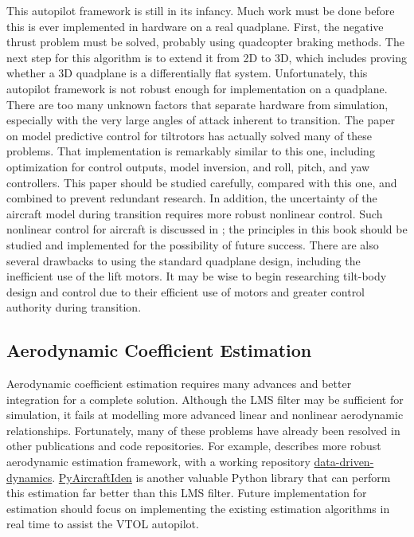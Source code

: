 This autopilot framework is still in its infancy.
Much work must be done before this is ever implemented in hardware on a real quadplane.
First, the negative thrust problem must be solved, probably using quadcopter braking methods.
The next step for this algorithm is to extend it from 2D to 3D, which includes proving whether a 3D quadplane is a differentially flat system.
Unfortunately, this autopilot framework is not robust enough for implementation on a quadplane. 
There are too many unknown factors that separate hardware from simulation, especially with the very large angles of attack inherent to transition.
The paper on model predictive control for tiltrotors \cite{mpc_controller} has actually solved many of these problems.
That implementation is remarkably similar to this one, including optimization for control outputs, model inversion, and roll, pitch, and yaw controllers.
This paper should be studied carefully, compared with this one, and combined to prevent redundant research.
In addition, the uncertainty of the aircraft model during transition requires more robust nonlinear control.
Such nonlinear control for aircraft is discussed in \cite{lavretskyRobustAdaptiveControl2024}; the principles in this book should be studied and implemented for the possibility of future success.
There are also several drawbacks to using the standard quadplane design, including the inefficient use of the lift motors.
It may be wise to begin researching tilt-body design and control \cite{lou_unified_energy_control_tilt_body} due to their efficient use of motors and greater control authority during transition.

\subsection{Aerodynamic Coefficient Estimation}

Aerodynamic coefficient estimation requires many advances and better integration for a complete solution.
Although the LMS filter may be sufficient for simulation, it fails at modelling more advanced linear and nonlinear aerodynamic relationships.
Fortunately, many of these problems have already been resolved in other publications and code repositories. 
For example, \cite{galliker2021datadriven} describes more robust aerodynamic estimation framework, with a working repository \href{https://github.com/ethz-asl/data-driven-dynamics}{data-driven-dynamics}. 
\href{https://github.com/xuhao1/pyAircraftIden}{PyAircraftIden} is another valuable Python library that can perform this estimation far better than this LMS filter.
Future implementation for estimation should focus on implementing the existing estimation algorithms in real time to assist the VTOL autopilot.

